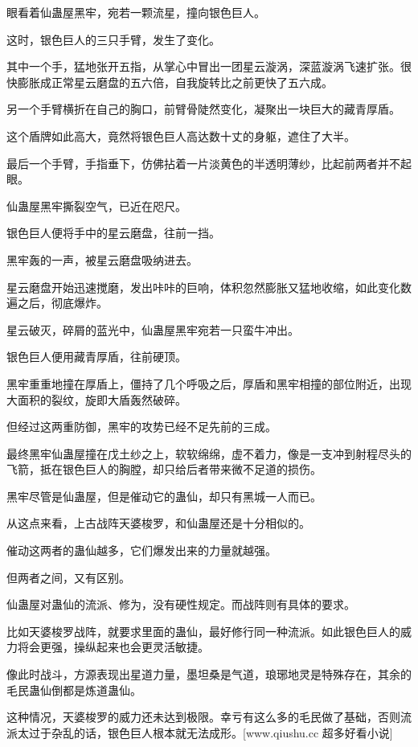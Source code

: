 
\begin{this_body}

眼看着仙蛊屋黑牢，宛若一颗流星，撞向银色巨人。

这时，银色巨人的三只手臂，发生了变化。

其中一个手，猛地张开五指，从掌心中冒出一团星云漩涡，深蓝漩涡飞速扩张。很快膨胀成正常星云磨盘的五六倍，自我旋转比之前更快了五六成。

另一个手臂横折在自己的胸口，前臂骨陡然变化，凝聚出一块巨大的藏青厚盾。

这个盾牌如此高大，竟然将银色巨人高达数十丈的身躯，遮住了大半。

最后一个手臂，手指垂下，仿佛拈着一片淡黄色的半透明薄纱，比起前两者并不起眼。

仙蛊屋黑牢撕裂空气，已近在咫尺。

银色巨人便将手中的星云磨盘，往前一挡。

黑牢轰的一声，被星云磨盘吸纳进去。

星云磨盘开始迅速搅磨，发出咔咔的巨响，体积忽然膨胀又猛地收缩，如此变化数遍之后，彻底爆炸。

星云破灭，碎屑的蓝光中，仙蛊屋黑牢宛若一只蛮牛冲出。

银色巨人便用藏青厚盾，往前硬顶。

黑牢重重地撞在厚盾上，僵持了几个呼吸之后，厚盾和黑牢相撞的部位附近，出现大面积的裂纹，旋即大盾轰然破碎。

但经过这两重防御，黑牢的攻势已经不足先前的三成。

最终黑牢仙蛊屋撞在戊土纱之上，软软绵绵，虚不着力，像是一支冲到射程尽头的飞箭，抵在银色巨人的胸膛，却只给后者带来微不足道的损伤。

黑牢尽管是仙蛊屋，但是催动它的蛊仙，却只有黑城一人而已。

从这点来看，上古战阵天婆梭罗，和仙蛊屋还是十分相似的。

催动这两者的蛊仙越多，它们爆发出来的力量就越强。

但两者之间，又有区别。

仙蛊屋对蛊仙的流派、修为，没有硬性规定。而战阵则有具体的要求。

比如天婆梭罗战阵，就要求里面的蛊仙，最好修行同一种流派。如此银色巨人的威力将会更强，操纵起来也会更灵活敏捷。

像此时战斗，方源表现出星道力量，墨坦桑是气道，琅琊地灵是特殊存在，其余的毛民蛊仙倒都是炼道蛊仙。

这种情况，天婆梭罗的威力还未达到极限。幸亏有这么多的毛民做了基础，否则流派太过于杂乱的话，银色巨人根本就无法成形。[www.qiushu.cc 超多好看小说]


\end{this_body}
